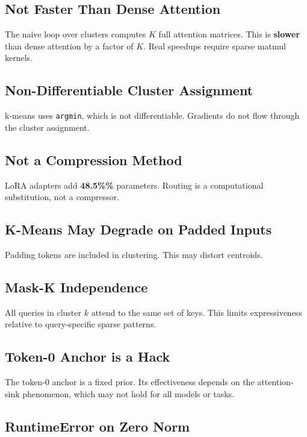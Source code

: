\subsection{Not Faster Than Dense Attention}

The naive loop over clusters computes $K$ full attention matrices. This is 
\textbf{slower} than dense attention by a factor of $K$. Real speedups require 
sparse matmul kernels.

\subsection{Non-Differentiable Cluster Assignment}

k-means uses \texttt{argmin}, which is not differentiable. Gradients do not flow 
through the cluster assignment.

\subsection{Not a Compression Method}

LoRA adapters add \textbf{48.5\%\%} parameters. Routing is a computational 
substitution, not a compressor.

\subsection{K-Means May Degrade on Padded Inputs}

Padding tokens are included in clustering. This may distort centroids.

\subsection{Mask-K Independence}

All queries in cluster $k$ attend to the same set of keys. This limits 
expressiveness relative to query-specific sparse patterns.

\subsection{Token-0 Anchor is a Hack}

The token-0 anchor is a fixed prior. Its effectiveness depends on the 
attention-sink phenomenon, which may not hold for all models or tasks.

\subsection{RuntimeError on Zero Norm}

